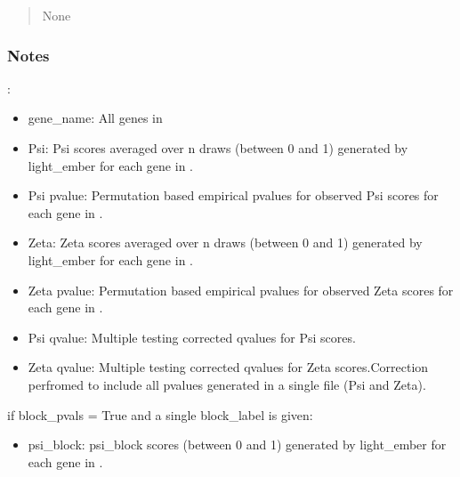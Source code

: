 \documentclass[letterpaper,10pt,english]{sphinxmanual}
\begin{document}
\begin{fulllineitems}
\begin{quote}
\begin{description}
\begin{itemize}
\end{itemize}

\sphinxAtStartPar
None

\end{description}\end{quote}
\subsubsection*{Notes}

\sphinxAtStartPar
{}:
\begin{itemize}
\item {} 
\sphinxAtStartPar
gene\_name: All genes in 

\item {} 
\sphinxAtStartPar
Psi: Psi scores averaged over n draws (between 0 and 1) generated by light\_ember for each gene in .

\item {} 
\sphinxAtStartPar
Psi p\sphinxhyphen{}value: Permutation based empirical p\sphinxhyphen{}values for observed Psi scores for each gene in .

\item {} 
\sphinxAtStartPar
Zeta: Zeta scores averaged over n draws (between 0 and 1) generated by light\_ember for each gene in .

\item {} 
\sphinxAtStartPar
Zeta p\sphinxhyphen{}value: Permutation based empirical p\sphinxhyphen{}values for observed Zeta scores for each gene in .

\item {} 
\sphinxAtStartPar
Psi q\sphinxhyphen{}value: Multiple testing corrected q\sphinxhyphen{}values for Psi scores.

\item {} 
\sphinxAtStartPar
Zeta q\sphinxhyphen{}value: Multiple testing corrected q\sphinxhyphen{}values for Zeta scores.Correction perfromed to include all p\sphinxhyphen{}values generated in a single file (Psi and Zeta).

\end{itemize}

\sphinxAtStartPar
if block\_pvals = True and a single block\_label is given:
\begin{itemize}
\item {} 
\sphinxAtStartPar
psi\_block: psi\_block scores (between 0 and 1) generated by light\_ember for each gene in .


\end{itemize}
\end{fulllineitems}
\end{document}
